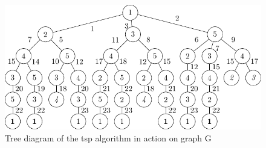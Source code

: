 \begin{figure}
\centering
\includegraphics[keepaspectratio,width=1.0\textwidth]{chapters/tsp/figs/ugraph-figure1}
\caption[A tree diagram representing all potential evolutions of the \gls{cps}  algorithm on the graph in \cref{fig:tsp:ugraph}]{\label{fig:tsp:utree}Tree diagram of the \gls{tsp} algorithm in action on graph G}
\end{figure}

\begin{cpobjectsfloat}
\begin{cpobjects}
    
    
    
    
\end{cpobjects}
\caption[Starting set of subcells from \cref{fig:tsp:utree}]{\label{objs:tsp:obj1}Set of subcells from G in the \gls{tlc} at the initial state}
\end{cpobjectsfloat}

